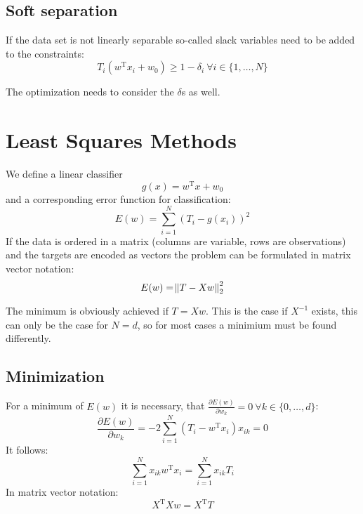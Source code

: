 \subsection{Soft separation}
If the data set is not linearly separable so-called slack variables need to be added to the constraints:
\begin{equation*}
    T_i (w^\text{T} x_i + w_0) \geq 1 - \delta_i\ \forall i \in \{1, \ldots, N\}
\end{equation*}

The optimization needs to consider the $\delta$s as well.

\section{Least Squares Methods}
We define a linear classifier
\begin{equation*}
    g(x) = w^\text{T} x + w_0
\end{equation*}
and a corresponding error function for classification:
\begin{equation*}
    E(w) = \sum_{i=1}^N {(T_i - g(x_i))}^2
\end{equation*}
If the data is ordered in a matrix (columns are variable, rows are observations) and the targets are encoded as vectors the problem can be formulated in matrix vector notation:
\begin{equation*}
    E(w) = \norm{T - X w }_2^2
\end{equation*}

The minimum is obviously achieved if $T = Xw$. This is the case if $X^{-1}$ exists, this can only be the case for $N=d$, so for most cases a minimium must be found differently.

\subsection{Minimization}
For a minimum of $E(w)$ it is necessary, that $\frac{\partial E(w)}{\partial w_k} = 0\ \forall k \in \{0, \ldots, d\}$:
\begin{equation*}
    \frac{\partial E(w)}{\partial w_k} = -2 \sum_{i=1}^N (T_i - w^\text{T} x_i) x_{ik} = 0
\end{equation*}
It follows:
\begin{equation*}
    \sum_{i=1}^N x_{ik} w^\text{T} x_i = \sum_{i=1}^N x_{ik} T_i 
\end{equation*}
In matrix vector notation:
\begin{equation*}
    X^\text{T} X w = X^\text{T} T
\end{equation*}
